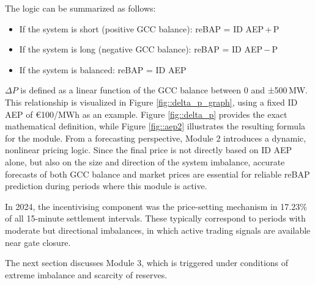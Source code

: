 \documentclass[class=scrbook, crop=false]{standalone}
\begin{document}
The logic can be summarized as follows:
\begin{itemize}
\item If the system is short (positive GCC balance):
 reBAP = ID AEP + \Delta P
\item If the system is long (negative GCC balance):
 reBAP = ID AEP − \Delta P
\item If the system is balanced:
 reBAP = ID AEP
\end{itemize}

$\Delta P$ is defined as a linear function of the GCC balance between 0 and ±500 MW. This relationship is visualized in Figure \ref{fig::delta_p_graph}, using a fixed ID AEP of €100/MWh as an example. Figure \ref{fig::delta_p} provides the exact mathematical definition, while Figure \ref{fig::aep2} illustrates the resulting formula for the module.
From a forecasting perspective, Module 2 introduces a dynamic, nonlinear pricing logic. Since the final price is not directly based on ID AEP alone, but also on the size and direction of the system imbalance, accurate forecasts of both GCC balance and market prices are essential for reliable reBAP prediction during periods where this module is active.

In 2024, the incentivising component was the price-setting mechanism in 17.23\% of all 15-minute settlement intervals. These typically correspond to periods with moderate but directional imbalances, in which active trading signals are available near gate closure.

The next section discusses Module 3, which is triggered under conditions of extreme imbalance and scarcity of reserves.

\end{document}
